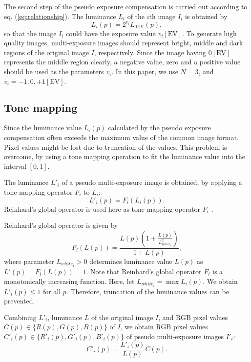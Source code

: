 \documentclass[paper]{ieice}
\begin{document}
  The second step of the pseudo exposure compensation is carried out
  according to eq. (\ref{eq:relationship}).
  The luminance $L_i$ of the $i$th image $I_i$ is obtained by
  \begin{equation}
    L_i(p) = 2^{v_i} L_{0\mathrm{EV}}(p),
    \label{eq:constMultiplication}
  \end{equation}
  so that the image $I_i$ could have the exposure value $v_i \mathrm{[EV]}$.
  To generate high quality images,
  multi-exposure images should represent bright, middle and dark
  regions of the original image $I$, respectively.
  Since the image having $0 \mathrm{[EV]}$ represents the middle region clearly, 
  a negative value, zero and a positive value should be used as the parameters $v_i$.
  In this paper, we use $N = 3$, and $v_i = -1, 0, +1 \mathrm{[EV]}$.
%
\subsection{Tone mapping}
  Since the luminance value $L_i(p)$ calculated by the pseudo exposure compensation
  often exceeds the maximum value of the common image format.
  Pixel values might be lost due to truncation of the values.
  This problem is overcome, by using a tone mapping operation
  to fit the luminance value into the interval $[0, 1]$.

  The luminance $L'_i$ of a pseudo multi-exposure image is obtained,
  by applying a tone mapping operator $F_i$ to $L_i$:
  \begin{equation}
    L'_i(p) = F_i(L_i(p)).
    \label{eq:TM}
  \end{equation}
  Reinhard's global operator is used here as tone mapping operator $F_i$
  \cite{reinhard2002photographic}.
  
  Reinhard's global operator is given by
  \begin{equation}
    F_i(L(p)) = \frac{L(p)\left(1 + \frac{L(p)}{L^2_{white_i}} \right)}{1 + L(p)},
    \label{eq:reinhardTMO}
  \end{equation}
  where parameter $L_{white_i} > 0$ determines luminance value $L(p)$
  as $L'(p) = F_i(L(p)) = 1$.
  Note that Reinhard's global operator $F_i$ is a monotonically increasing function.
  Here, let $L_{white_i} = \max L_i(p)$.
  We obtain $L'_i(p) \le 1$ for all $p$.
  Therefore, truncation of the luminance values can be prevented.

  Combining $L'_i$,
  luminance $L$ of the original image $I$,
  and RGB pixel values $C(p) \in \{R(p), G(p), B(p)\}$ of $I$,
  we obtain RGB pixel values $C'_i(p) \in \{R'_i(p), G'_i(p), B'_i(p)\}$ of
  pseudo multi-exposure images $I'_i$:
  \begin{equation}
    C'_i(p) = \frac{L'_i(p)}{L(p)}C(p).
    \label{eq:color}
  \end{equation}
%
\end{document}
